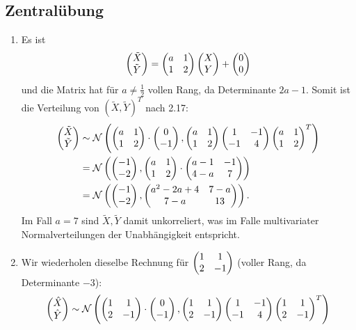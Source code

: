 \documentclass[a4paper]{article}
\begin{document}
\makeexheader

\subsection{Zentralübung}

\begin{enumerate}
    \item Es ist 
    \begin{equation*}
        \left(\begin{matrix}\tilde{X} \\ \tilde{Y}\end{matrix}\right) = \left(\begin{matrix}a & 1 \\ 1 & 2\end{matrix}\right) \left(\begin{matrix}X \\ Y\end{matrix}\right) + \left(\begin{matrix}0 \\ 0\end{matrix}\right)
    \end{equation*}
    und die Matrix hat für $a \neq \frac{1}{2}$ vollen Rang, da Determinante $2a - 1$.
    Somit ist die Verteilung von $(\tilde{X}, \tilde{Y})^T$ nach 2.17:
    \begin{align*}
        \left(\begin{matrix}\tilde{X} \\ \tilde{Y}\end{matrix}\right) &\sim \mathcal{N} \left( \left(\begin{matrix}a & 1 \\ 1 & 2\end{matrix}\right) \cdot \left(\begin{matrix}0 \\ -1\end{matrix}\right), \left(\begin{matrix}a & 1 \\ 1 & 2\end{matrix}\right) \left(\begin{matrix}1 & -1 \\ -1 & 4\end{matrix}\right) \left(\begin{matrix}a & 1 \\ 1 & 2\end{matrix}\right)^T  \right)\\
        &= \mathcal{N}\left( \left(\begin{matrix}-1 \\ -2\end{matrix}\right), \left(\begin{matrix}a & 1 \\ 1 & 2\end{matrix}\right) \cdot \left(\begin{matrix}a -1 & -1 \\ 4 - a & 7\end{matrix}\right) \right)\\
        &= \mathcal{N}\left( \left(\begin{matrix}-1 \\ -2\end{matrix}\right), \left(\begin{matrix}a^2 - 2a + 4 & 7-a \\ 7 - a & 13\end{matrix}\right) \right)\text{.}
    \end{align*}
    Im Fall $a = 7$ sind $\tilde{X}, \tilde{Y}$ damit unkorreliert, was im Falle multivariater Normalverteilungen der Unabhängigkeit entspricht.
    \item Wir wiederholen dieselbe Rechnung für $\left(\begin{matrix}1 & 1 \\ 2 & -1\end{matrix}\right)$ (voller Rang, da Determinante $-3$):
    \begin{align*}
        \qmatrix{\hat{X} \\ \hat{Y}} &\sim \mathcal{N} \left( \qmatrix{1 & 1 \\ 2 & -1} \cdot \qmatrix{0 \\ -1}, \qmatrix{1 & 1 \\ 2 & -1} \qmatrix{1 & -1 \\ -1 & 4} \qmatrix{1 & 1 \\ 2 & -1}^T  \right)\\

\end{align*}
\end{enumerate}
\end{document}

